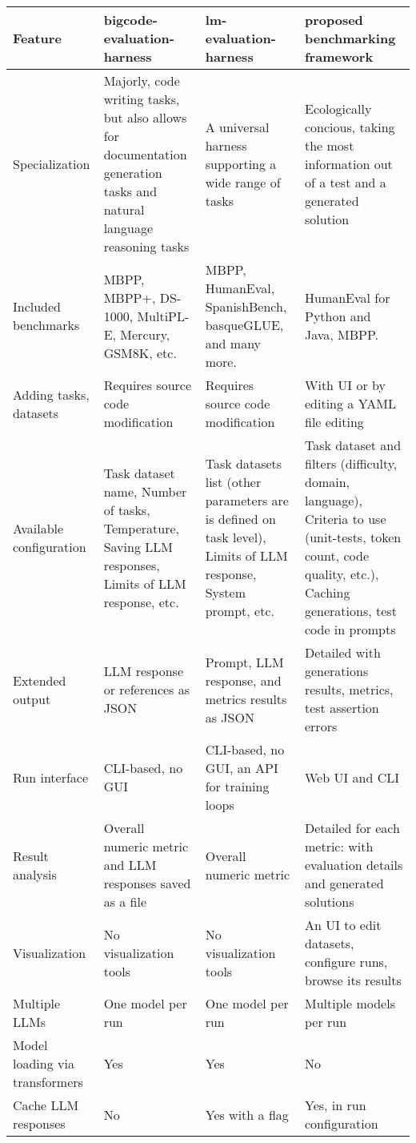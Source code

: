 \begin{longtable}{|p{2.3cm}|p{4.3cm}|p{4.3cm}|p{4.3cm}|}


       \hline
       \textbf{Feature} & \textbf{bigcode-evaluation-harness} & \textbf{lm-evaluation-harness} & \textbf{proposed benchmarking framework} \\
        \hline
        Specialization & Majorly, code writing tasks, but also allows for documentation generation tasks and natural language reasoning tasks & A universal harness supporting a wide range of tasks & Ecologically concious, taking the most information out of a test and a generated solution \\
        \hline
        Included benchmarks & MBPP, MBPP+, DS-1000, MultiPL-E, Mercury, GSM8K, etc. & MBPP, HumanEval, SpanishBench, basqueGLUE, and many more. & HumanEval for Python and Java, MBPP. \\
        \hline
        Adding tasks, datasets & Requires source code modification & Requires source code modification & With UI or by editing a YAML file editing \\
        \hline
        Available configuration & Task dataset name, Number of tasks, Temperature, Saving LLM responses, Limits of LLM response, etc. & Task datasets list (other parameters are is defined on task level), Limits of LLM response, System prompt, etc. & Task dataset and filters (difficulty, domain, language), Criteria to use (unit-tests, token count, code quality, etc.), Caching generations, test code in prompts \\
        \hline
        Extended output & LLM response or references as JSON & Prompt, LLM response, and metrics results as JSON & Detailed with generations results, metrics, test assertion errors  \\
        \hline
        Run interface & CLI-based, no GUI & CLI-based, no GUI, an API for training loops & Web UI and CLI \\
        \hline
        Result analysis & Overall numeric metric and LLM responses saved as a file & Overall numeric metric & Detailed for each metric: with evaluation details and generated solutions  \\
        \hline
        Visualization & No visualization tools & No visualization tools & An UI to edit datasets, configure runs, browse its results \\
        \hline
        Multiple LLMs & One model per run & One model per run & Multiple models per run\\
        \hline
        Model loading via transformers & Yes & Yes & No \\
        \hline
        Cache LLM responses & No & Yes with a flag & Yes, in run configuration \\
        \hline


\end{longtable}
